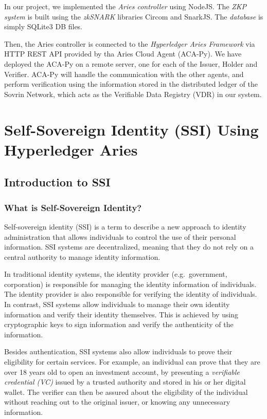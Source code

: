 \documentclass[
]{report}
\begin{document}
In our project, we implemented the \emph{Aries controller} using NodeJS.
The \emph{ZKP system} is built using the \emph{zkSNARK} libraries
Circom and SnarkJS. The \emph{database} is simply SQLite3 DB files.

Then, the Aries controller is connected to the \emph{Hyperledger Aries
Framework} via HTTP REST API provided by tha Aries Cloud Agent (ACA-Py).
We have deployed the ACA-Py on a remote server, one for each of the
Issuer, Holder and Verifier. ACA-Py will handle the communication with
the other agents, and perform verification using the information stored
in the distributed ledger of the Sovrin Network, which acts as the
Verifiable Data Registry (VDR) in our system.
\chapter{Self-Sovereign Identity (SSI) Using Hyperledger Aries}

\section{Introduction to SSI}
\subsection{What is Self-Sovereign Identity?}
Self-sovereign identity (SSI) is a term to describe a new approach to
identity administration that allows individuals to control the use of
their personal information. SSI systems are decentralized, meaning that
they do not rely on a central authority to manage identity information.

In traditional identity systems, the identity provider (e.g.~government,
corporation) is responsible for managing the identity information of
individuals. The identity provider is also responsible for verifying
the identity of individuals. In contrast, SSI systems allow individuals
to manage their own identity information and verify their identity
themselves. This is achieved by using cryptographic keys to sign
information and verify the authenticity of the information.

Besides authentication, SSI systems also allow individuals to prove their
eligibility for certain services. For example, an individual can prove
that they are over 18 years old to open an investment account, by
presenting a \emph{verifiable credential (VC)} issued by a trusted
authority and stored in his or her digital wallet. The verifier can
then be assured about the eligibility of the individual without reaching
out to the original issuer, or knowing any unnecessary information.
\end{document}
